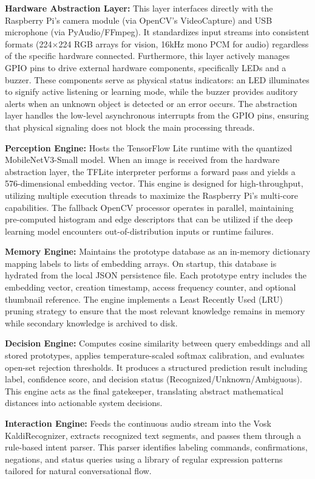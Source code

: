 \documentclass[12pt,a4paper]{report}
\begin{document}
\textbf{Hardware Abstraction Layer:} This layer interfaces directly with the Raspberry Pi's camera module (via OpenCV's VideoCapture) and USB microphone (via PyAudio/FFmpeg). It standardizes input streams into consistent formats (224$\times$224 RGB arrays for vision, 16kHz mono PCM for audio) regardless of the specific hardware connected. Furthermore, this layer actively manages GPIO pins to drive external hardware components, specifically LEDs and a buzzer. These components serve as physical status indicators: an LED illuminates to signify active listening or learning mode, while the buzzer provides auditory alerts when an unknown object is detected or an error occurs. The abstraction layer handles the low-level asynchronous interrupts from the GPIO pins, ensuring that physical signaling does not block the main processing threads.

\textbf{Perception Engine:} Hosts the TensorFlow Lite runtime with the quantized MobileNetV3-Small model. When an image is received from the hardware abstraction layer, the TFLite interpreter performs a forward pass and yields a 576-dimensional embedding vector. This engine is designed for high-throughput, utilizing multiple execution threads to maximize the Raspberry Pi's multi-core capabilities. The fallback OpenCV processor operates in parallel, maintaining pre-computed histogram and edge descriptors that can be utilized if the deep learning model encounters out-of-distribution inputs or runtime failures.

\textbf{Memory Engine:} Maintains the prototype database as an in-memory dictionary mapping labels to lists of embedding arrays. On startup, this database is hydrated from the local JSON persistence file. Each prototype entry includes the embedding vector, creation timestamp, access frequency counter, and optional thumbnail reference. The engine implements a Least Recently Used (LRU) pruning strategy to ensure that the most relevant knowledge remains in memory while secondary knowledge is archived to disk.

\textbf{Decision Engine:} Computes cosine similarity between query embeddings and all stored prototypes, applies temperature-scaled softmax calibration, and evaluates open-set rejection thresholds. It produces a structured prediction result including label, confidence score, and decision status (Recognized/Unknown/Ambiguous). This engine acts as the final gatekeeper, translating abstract mathematical distances into actionable system decisions.

\textbf{Interaction Engine:} Feeds the continuous audio stream into the Vosk KaldiRecognizer, extracts recognized text segments, and passes them through a rule-based intent parser. This parser identifies labeling commands, confirmations, negations, and status queries using a library of regular expression patterns tailored for natural conversational flow.
\end{document}
